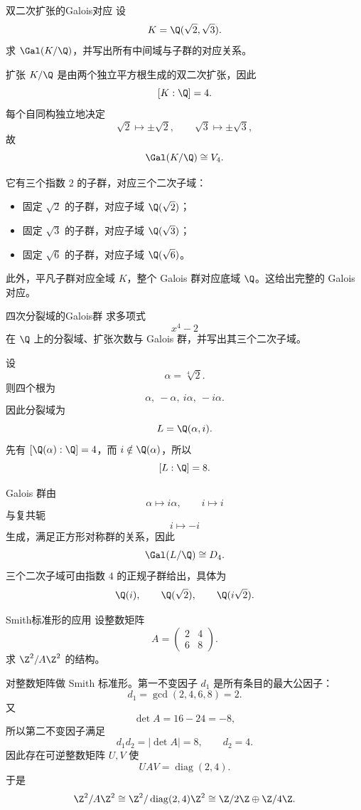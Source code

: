 \begin{problem}{双二次扩张的Galois对应}
\hard
设
\[
K=\Q(\sqrt2,\sqrt3).
\]
求 $\Gal(K/\Q)$，并写出所有中间域与子群的对应关系。
\end{problem}
\begin{solution}
扩张 $K/\Q$ 是由两个独立平方根生成的双二次扩张，因此
\[
[K:\Q]=4.
\]
每个自同构独立地决定
\[
\sqrt2\mapsto\pm\sqrt2,
\qquad
\sqrt3\mapsto\pm\sqrt3,
\]
故
\[
\Gal(K/\Q)\cong V_4.
\]

它有三个指数 $2$ 的子群，对应三个二次子域：
\begin{itemize}
\item[(i)] 固定 $\sqrt2$ 的子群，对应子域 $\Q(\sqrt2)$；
\item[(ii)] 固定 $\sqrt3$ 的子群，对应子域 $\Q(\sqrt3)$；
\item[(iii)] 固定 $\sqrt6$ 的子群，对应子域 $\Q(\sqrt6)$。
\end{itemize}
此外，平凡子群对应全域 $K$，整个 Galois 群对应底域 $\Q$。这给出完整的 Galois 对应。
\end{solution}

\begin{problem}{四次分裂域的Galois群}
\hard
求多项式
\[
x^4-2
\]
在 $\Q$ 上的分裂域、扩张次数与 Galois 群，并写出其三个二次子域。
\end{problem}
\begin{solution}
设
\[
\alpha=\sqrt[4]{2}.
\]
则四个根为
\[
\alpha,\ -\alpha,\ i\alpha,\ -i\alpha.
\]
因此分裂域为
\[
L=\Q(\alpha,i).
\]
先有 $[\Q(\alpha):\Q]=4$，而 $i\notin\Q(\alpha)$，所以
\[
[L:\Q]=8.
\]

Galois 群由
\[
\alpha\mapsto i\alpha,
\qquad i\mapsto i
\]
与复共轭
\[
i\mapsto -i
\]
生成，满足正方形对称群的关系，因此
\[
\Gal(L/\Q)\cong D_4.
\]
三个二次子域可由指数 $4$ 的正规子群给出，具体为
\[
\Q(i),
\qquad \Q(\sqrt2),
\qquad \Q(i\sqrt2).
\]
\end{solution}

\begin{problem}{Smith标准形的应用}
\hard
设整数矩阵
\[
A=\begin{pmatrix}2&4\\6&8\end{pmatrix}.
\]
求 $\Z^2/A\Z^2$ 的结构。
\end{problem}
\begin{solution}
对整数矩阵做 Smith 标准形。第一不变因子 $d_1$ 是所有条目的最大公因子：
\[
d_1=\gcd(2,4,6,8)=2.
\]
又
\[
\det A=16-24=-8,
\]
所以第二不变因子满足
\[
d_1d_2=|\det A|=8,
\qquad d_2=4.
\]
因此存在可逆整数矩阵 $U,V$ 使
\[
UAV=\operatorname{diag}(2,4).
\]
于是
\[
\Z^2/A\Z^2\cong \Z^2/\operatorname{diag}(2,4)\Z^2
\cong \Z/2\Z\oplus\Z/4\Z.
\]
\end{solution}

